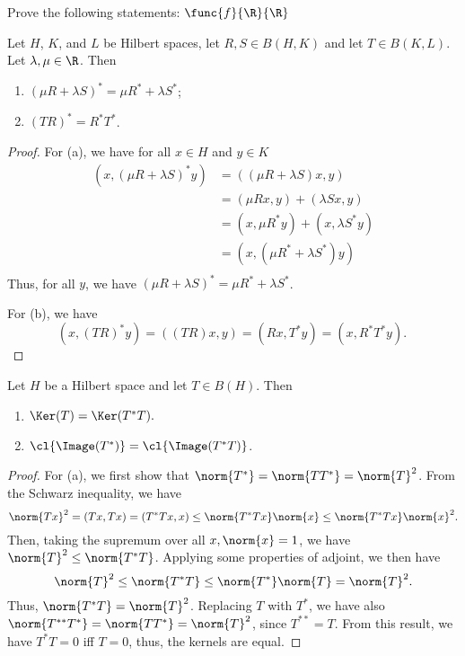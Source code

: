 \documentclass[12pt,letterpaper,twoside]{hmcpset}
\begin{document}
\noindent Prove the following statements:
$\func{f}{\R}{\R}$
\begin{problem}[1]
  Let $H$, $K$, and $L$ be Hilbert spaces, let $R,S \in B(H,K)$ and let $T \in B(K,L)$. Let $\lambda, \mu \in \R$.
  Then
  \begin{enumerate}[label=(\alph*)]
  \item $(\mu R + \lambda S)^* = \mu R^* + \lambda S^*$;
  \item $(TR)^* = R^*T^*$.
  \end{enumerate}
\end{problem}

\begin{solution}
  \begin{proof}
    For (a), we have for all $x \in H$ and $y \in K$
    \begin{align*}
      (x,(\mu R + \lambda S)^* y) &= ((\mu R + \lambda S) x, y) \\
      {} &= (\mu Rx, y) + (\lambda Sx, y) \\
      {} &= (x, \mu R^* y) + (x, \lambda S^* y) \\
      {} &= (x, (\mu R^* + \lambda S^*) y )\\
    \end{align*}
    Thus, for all $y$, we have $(\mu R + \lambda S)^* = \mu R^* + \lambda S^*$.
    
    For (b), we have \[
    (x,(TR)^* y) = ((TR)x, y) = (Rx, T^*y) = (x, R^*T^*y).\
    \]

  \end{proof}
\end{solution}

\begin{problem}[2]
  Let $H$ be a Hilbert space and let $T \in B(H)$. Then
  \begin{enumerate}[label=(\alph*)]
  \item $\Ker(T) = \Ker(T^*T).$
  \item $\cl{\Image(T^*)} = \cl{\Image(T^*T)}$.
  \end{enumerate}
\end{problem}

\begin{solution}
  \begin{proof}
    \label{prf:1}
    For (a), we first show that $\norm{T^*} = \norm{TT^*} = \norm{T}^2$.
    From the Schwarz inequality, we have \[
    \norm{Tx}^2 = (Tx, Tx) = (T^*Tx, x) \leq \norm{T^*Tx}\norm{x} \leq \norm{T^*Tx}\norm{x}^2. 
    \]
    Then, taking the supremum over all $x, \norm{x} = 1$, we have $\norm{T}^2 \leq \norm{T^*T}$.
    Applying some properties of adjoint, we then have \[
    \norm{T}^2 \leq \norm{T^*T} \leq \norm{T^*}\norm{T} = \norm{T}^2.
    \]
    Thus, $\norm{T^*T} = \norm{T}^2$. 
    Replacing $T$ with $T^*$, we have also $\norm{T^{**}T^*} = \norm{TT^*} = \norm{T}^2$, since $T^{**} = T$.
    From this result, we have $T^*T = 0$ iff $T = 0$, thus, the kernels are equal.
  \end{proof}
\end{solution}
\end{document}
